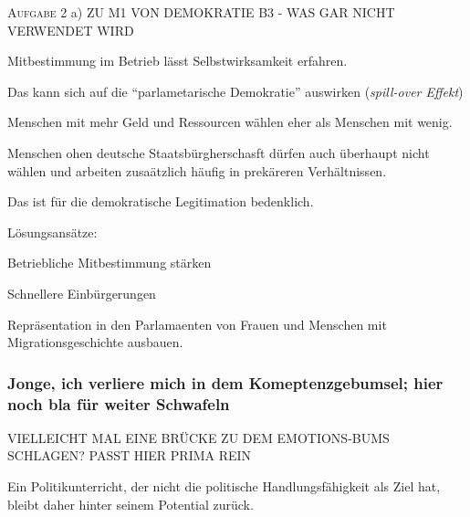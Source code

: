 \restoregeometry %










\textsc{Aufgabe 2} a) \quad
ZU M1 VON DEMOKRATIE B3 - WAS GAR NICHT VERWENDET WIRD
\begin{myitemize}
    \item Mitbestimmung im Betrieb lässt Selbstwirksamkeit erfahren.
    \item Das kann sich auf die \enquote{parlametarische Demokratie} auswirken (\emph{spill-over Effekt})
    \item Menschen mit mehr Geld und Ressourcen wählen eher als Menschen mit wenig.
    \item Menschen ohen deutsche Staatsbürgherschasft dürfen auch überhaupt nicht wählen und arbeiten zusaätzlich häufig in prekäreren Verhältnissen. 
    \item Das ist für die demokratische Legitimation bedenklich.
    \item Lösungsansätze: 
        \begin{myitemize}
            \item Betriebliche Mitbestimmung stärken
            \item Schnellere Einbürgerungen 
            \item Repräsentation in den Parlamaenten von Frauen und Menschen mit Migrationsgeschichte ausbauen.
        \end{myitemize} 
\end{myitemize}


\subsubsection{Jonge, ich verliere mich in dem Komeptenzgebumsel; hier noch bla für weiter Schwafeln}
VIELLEICHT MAL EINE BRÜCKE ZU DEM EMOTIONS-BUMS SCHLAGEN? PASST HIER PRIMA REIN



Ein Politikunterricht, der nicht die politische Handlungsfähigkeit als Ziel hat, bleibt daher hinter seinem Potential zurück.




